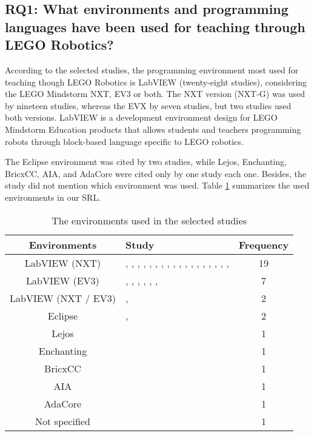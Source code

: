 \documentclass[conference]{IEEEtran}
\begin{document}
\subsection{RQ1: What environments and programming languages have been used for teaching through LEGO Robotics?}

According to the selected studies, the programming environment most used for teaching though LEGO Robotics is LabVIEW (twenty-eight studies), considering the LEGO Mindstorm NXT, EV3 or both. The NXT version (NXT-G) was used by nineteen studies, whereas the EVX by seven studies, but two studies used both versions. LabVIEW is a development environment design for LEGO Mindstorm Education products that allows students and teachers programming robots through block-based language specific to LEGO robotics.

The Eclipse environment was cited by two studies, while Lejos, Enchanting, BricxCC, AIA, and AdaCore were cited only by one study each one. Besides, the study \cite{E23} did not mention which environment was used.  Table \ref{environments_used} summarizes the used environments in our SRL.

\begin{table}[h]
\renewcommand{\arraystretch}{1.3}
\caption{The environments used in the selected studies}
\label{environments_used}
\centering
\begin{tabular}{|c||p{3cm}||c|}
\hline \textbf{Environments} &\textbf{Study} & \textbf{Frequency}\\
\hline LabVIEW (NXT)	 & \cite{E03}, \cite{E04}, \cite{E09}, \cite{E11}, \cite{E15}, \cite{E20}, \cite{E21}, \cite{E24}, \cite{E25}, \cite{E26}, \cite{E27}, \cite{E28}, \cite{E30}, \cite{E31}, \cite{E32}, \cite{E33}, \cite{E34}, \cite{E35}, \cite{E36}    & 19\\
\hline LabVIEW (EV3) & \cite{E01}, \cite{E05}, \cite{E06}, \cite{E07}, \cite{E08}, \cite{E12}, \cite{E16} & 7\\
\hline LabVIEW (NXT / EV3) & \cite{E10}, \cite{E14} & 2\\
\hline Eclipse & \cite{E13}, \cite{E19} & 2\\
\hline Lejos & \cite{E22} & 1\\
\hline Enchanting & \cite{E18} & 1\\
\hline BricxCC & \cite{E02} & 1\\
\hline AIA & \cite{E29} & 1\\
\hline AdaCore & \cite{E17} & 1\\
\hline Not specified & \cite{E23} & 1\\
\hline
\end{tabular}
\end{table}
\end{document}
